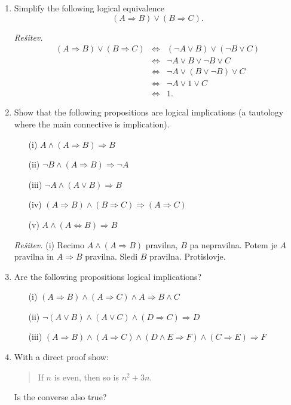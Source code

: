 \documentclass[11pt,paper=b5,footinclude,headinclude]{scrbook} %
\theoremstyle{remark}
\theoremstyle{definition} %
\theoremstyle{theorem} %
\begin{document}
\begin{enumerate}
\item Simplify the following logical equivalence
$$(A\Rightarrow B) \vee (B \Rightarrow C).$$

\emph{Rešitev.} 
\begin{eqnarray*}
(A\Rightarrow B) \vee (B \Rightarrow C) &\Leftrightarrow & (\neg A \vee B) \vee (\neg B \vee C)\\
&\Leftrightarrow & \neg A \vee B \vee \neg B \vee C\\
&\Leftrightarrow & \neg A \vee (B \vee \neg B) \vee C\\
&\Leftrightarrow & \neg A \vee 1 \vee C\\
&\Leftrightarrow & 1.
\end{eqnarray*}

\item Show that the following propositions are logical implications (a tautology where the main connective is implication).
\begin{enumerate}
\item[(i)] $A \wedge (A \Rightarrow B) \Rightarrow B$
\item[(ii)] $\neg B \wedge (A \Rightarrow B) \Rightarrow \neg A$
\item[(iii)] $\neg A \wedge (A \vee B) \Rightarrow B$
\item[(iv)] $(A \Rightarrow B) \wedge (B \Rightarrow C) \Rightarrow (A \Rightarrow C)$
\item[(v)] $A \wedge (A \Leftrightarrow B) \Rightarrow B$
\end{enumerate}

\emph{Rešitev.} (i) Recimo $A \wedge (A \Rightarrow B)$ pravilna, $B$ pa nepravilna. Potem je $A$ pravilna in $A\Rightarrow B$ pravilna. Sledi $B$ pravilna. Protislovje. 


\item Are the following propositions logical implications?
\begin{enumerate}
\item[(i)] $(A \Rightarrow B ) \wedge (A \Rightarrow C) \wedge A \Rightarrow B \wedge C$
\item[(ii)] $\neg (A \vee B) \wedge (A\vee C) \wedge (D\Rightarrow C) \Rightarrow D$
\item[(iii)] $(A\Rightarrow B) \wedge (A\Rightarrow C) \wedge (D\wedge E \Rightarrow F) \wedge (C\Rightarrow E) \Rightarrow F$
\end{enumerate}

\item With a direct proof show:
\begin{quote}
    If $n$ is even, then so is $n^2 +3n$.
\end{quote}
Is the converse also true?


\end{enumerate}
\end{document}
